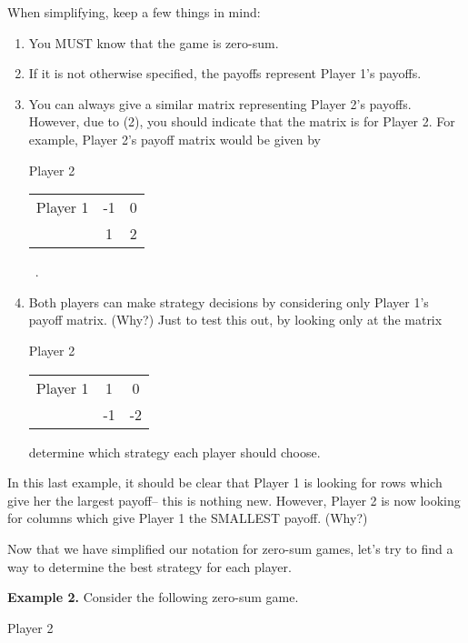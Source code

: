 When simplifying, keep a few things in mind:
\begin{enumerate}
\item You MUST know that the game is zero-sum.
\item If it is not otherwise specified, the payoffs represent Player 1's payoffs.
\item You can always give a similar matrix representing Player 2's payoffs. However, due to (2), you should indicate that the matrix is for Player 2. For example, Player 2's payoff matrix would be given by

\hspace{.8in}Player 2

\begin{tabular}{l|c|c|}\cline{2-3}
Player 1&-1&0\\ \cline{2-3}
&1&2\\ \cline{2-3}

\end{tabular}\ .

\medskip
\item Both players can make strategy decisions by considering only Player 1's payoff matrix. (Why?) Just to test this out, by looking only at the matrix 

\hspace{.8in}Player 2

\begin{tabular}{l|c|c|}\cline{2-3}
Player 1&1&0\\ \cline{2-3}
&-1&-2\\ \cline{2-3}

\end{tabular}
\medskip

 determine which strategy each player should choose.

\end{enumerate}

In this last example, it should be clear that Player 1 is looking for rows which give her the largest payoff-- this is nothing new. However, Player 2 is now looking for columns which give Player 1 the SMALLEST payoff. (Why?) 

Now that we have simplified our notation for zero-sum games, let's try to find a way to determine the best strategy for each player.

\break

{\bf Example 2.} Consider the following zero-sum game.

\hspace{1in}Player 2

